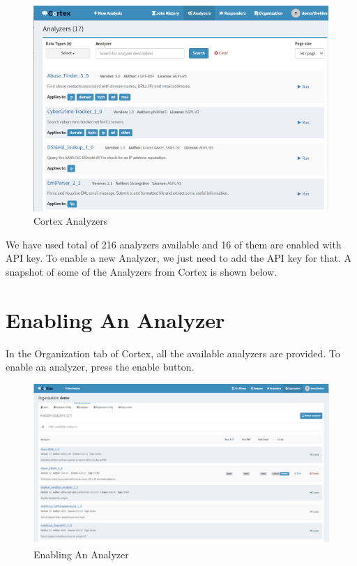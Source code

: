 \documentclass{book}
\begin{document}
\begin{figure}[htbp]
    \centering
    \includegraphics[width=1\linewidth]{cortex_images/cortex___1.png}
    \caption{Cortex Analyzers}
    \label{fig:Cortex Analyzers}
\end{figure}

We have used total of 216 analyzers available and
16 of them are enabled with API key. To enable a new Analyzer, we just
need to add the API key for that. A snapshot of some of the Analyzers from
Cortex is shown below.

\newpage

\section{Enabling An Analyzer}
In the Organization tab of Cortex, all the available analyzers are
provided. To enable an analyzer, press the enable button.
\begin{figure}[htbp]
    \centering
    \includegraphics[width=1\linewidth]{cortex_images/cortex___2.png}
    \caption{Enabling An Analyzer}
    \label{fig:Enabling An Analyzer}
\end{figure}
\end{document}
